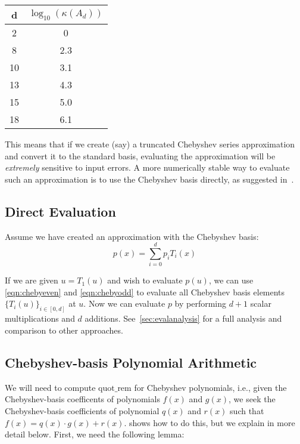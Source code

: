 \documentclass[../fheimpl.tex]{subfiles}
\begin{document}
\begin{center}
	\begin{tabular}{ |c|c| } 
		\hline
		d & $\log_{10}(\kappa(A_d))$ \\ 
		\hline
		2 & 0 \\
		8 & 2.3 \\ 
		10 & 3.1 \\ 
		13 & 4.3 \\ 
		15 & 5.0 \\ 
		18 & 6.1 \\ 
		\hline
	\end{tabular}
\end{center}

This means that if we create (say) a truncated Chebyshev series approximation and convert it to the standard basis, evaluating the approximation will be \emph{extremely} sensitive to input errors. A more numerically stable way to evaluate such an approximation is to use the Chebyshev basis directly, as suggested in~\cite{cryptoeprint:2018/1043}.


\subsection{Direct Evaluation}
Assume we have created an approximation with the Chebyshev basis:
\[p(x)=\sum_{i=0}^d p_iT_i(x)\]

If we are given $u=T_1(u)$ and wish to evaluate $p(u)$, we can use \cref{eqn:chebyeven} and \ref{eqn:chebyodd} to evaluate all Chebyshev basis elements $\{T_i(u)\}_{i\in [0, d]}$ at $u$. Now we can evaluate $p$ by performing $d+1$ scalar multiplications and $d$ additions. See~\cref{sec:evalanalysis} for a full analysis and comparison to other approaches.	

\subsection{Chebyshev-basis Polynomial Arithmetic}
We will need to compute $\text{quot\_rem}$ for Chebyshev polynomials, i.e., given the Chebyshev-basis coefficents of polynomials $f(x)$ and $g(x)$, we seek the Chebyshev-basis coefficients of polynomial $q(x)$ and $r(x)$ such that $f(x) = q(x)\cdot g(x) + r(x)$. \cite{cryptoeprint:2018/1043} shows how to do this, but we explain in more detail below. First, we need the following lemma:
\end{document}
